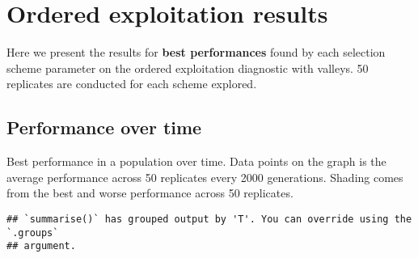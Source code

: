 \documentclass[]{book}
\newenvironment{Shaded}{\begin{snugshade}}{\end{snugshade}}
\newcommand{\DataTypeTok}[1]{\textcolor[rgb]{0.13,0.29,0.53}{#1}}
\newcommand{\KeywordTok}[1]{\textcolor[rgb]{0.13,0.29,0.53}{\textbf{#1}}}
\newcommand{\NormalTok}[1]{#1}
\newcommand{\OperatorTok}[1]{\textcolor[rgb]{0.81,0.36,0.00}{\textbf{#1}}}
\newcommand{\StringTok}[1]{\textcolor[rgb]{0.31,0.60,0.02}{#1}}
\begin{document}
\hypertarget{ordered-exploitation-results-1}{%
\section{Ordered exploitation results}\label{ordered-exploitation-results-1}}

Here we present the results for \textbf{best performances} found by each selection scheme parameter on the ordered exploitation diagnostic with valleys.
50 replicates are conducted for each scheme explored.

\hypertarget{performance-over-time-4}{%
\subsection{Performance over time}\label{performance-over-time-4}}

Best performance in a population over time.
Data points on the graph is the average performance across 50 replicates every 2000 generations.
Shading comes from the best and worse performance across 50 replicates.

\begin{Shaded}
\end{Shaded}

\begin{verbatim}
## `summarise()` has grouped output by 'T'. You can override using the `.groups`
## argument.
\end{verbatim}
\end{document}
